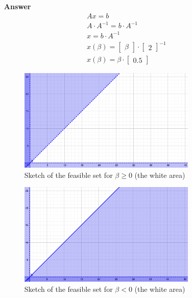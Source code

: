 \documentclass[10pt,a4paper]{article}
\theoremstyle{plain}
\theoremstyle{definition}
\begin{document}
\begin{enumerate}
\item[\textbf{Answer}]
  \begin{align*}
    Ax=b \\
    A \cdot A^{-1}=b \cdot A^{-1} \\
    x=b \cdot A^{-1} \\
    x(\beta)=\begin{bmatrix} \beta \end{bmatrix} \cdot \begin{bmatrix} 2 \end{bmatrix}^{-1} \\
    x(\beta)=\beta \cdot \begin{bmatrix} 0.5 \end{bmatrix}
  \end{align*}

  \begin{figure}[H]
    \centering
    \includegraphics[width=0.8\textwidth]{assets/feasible_set_bigger_than.png}
    \caption{Sketch of the feasible set for $\beta \geq 0$ (the white area)}
  \end{figure}

  \begin{figure}[H]
    \centering
    \includegraphics[width=0.8\textwidth]{assets/feasible_set_lower_than.png}
    \caption{Sketch of the feasible set for $\beta < 0$ (the white area)}
  \end{figure}

\end{enumerate}
\end{document}
